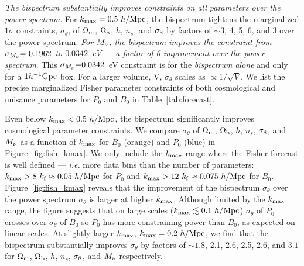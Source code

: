 {\em The bispectrum substantially improves constraints on all parameters 
over the power spectrum.} For $k_{\rm max} = 0.5~h/{\rm Mpc}$, the 
bispectrum tightens the marginalized $1\sigma$ constraints, $\sigma_\theta$, of $\Omega_{\rm m}$, 
$\Omega_{\rm b}$, $h$, $n_s$, and $\sigma_8$ by factors of $\sim$3, 4, 5, 6, and 3 over 
the power spectrum. {\em For $M_\nu$, the bispectrum improves the constraint 
from $\sigma_{M_\nu}{=}~0.1962$ to $0.0342$~eV --- a factor of 6 improvement 
over the power spectrum}. This $\sigma_{M_\nu}{=}0.0342$~eV constraint is for 
the {\em bispectrum alone} and only for a $1h^{-1}{\rm Gpc}$ box. For a larger 
volume, V, $\sigma_\theta$ scales as $\propto1/\sqrt{V}$. We list the precise
marginalized Fisher parameter constraints of both cosmological and nuisance 
parameters for $P_0$ and $B_0$ in Table~\ref{tab:forecast}. 

Even below $k_{\rm max} < 0.5~h/{\rm Mpc}$, the bispectrum significantly 
improves cosmological parameter constraints. We compare $\sigma_\theta$ 
of $\Omega_{\rm m}$, $\Omega_{\rm b}$, $h$, $n_s$, $\sigma_8$, and $M_\nu$ as a function of $k_{\rm max}$ 
for $B_0$ (orange) and $P_0$ (blue) in Figure~\ref{fig:fish_kmax}. We only 
include the $k_{\rm max}$ range where the Fisher forecast is well defined --- 
\emph{i.e.} more data bins than the number of parameters: $k_{\rm max} > 8~k_{\rm f} \approx 0.05~h/{\rm Mpc}$ 
for $P_0$ and $k_{\rm max} > 12~k_{\rm f} \approx 0.075~h/{\rm Mpc}$ for 
$B_0$. Figure~\ref{fig:fish_kmax} reveals that the improvement of the
bispectrum $\sigma_\theta$ over the power spectrum $\sigma_\theta$ is 
larger at higher $k_{\rm max}$. Although limited by the $k_{\rm max}$ range, 
the figure suggests that on large scales ($k_{\rm max}\lesssim 0.1~h/{\rm Mpc}$) 
$\sigma_\theta$ of $P_0$ crosses over $\sigma_\theta$ of $B_0$ so $P_0$ has more 
constraining power than $B_0$, as expected on linear scales. At slightly 
larger $k_{\rm max}$, $k_{\rm max} = 0.2~h/{\rm Mpc}$, we find that 
the bispectrum substantially improves $\sigma_\theta$ by factors of
$\sim 1.8$, 2.1, 2.6, 2.5, 2.6, and $3.1$ for $\Omega_{\rm m}$, $\Omega_{\rm b}$, $h$, $n_s$, $\sigma_8$, 
and $M_\nu$ respectively. 

